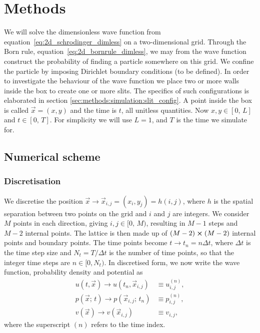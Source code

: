 
\section{Methods}\label{sec:methods}

We will solve the dimensionless wave function from equation~\eqref{eq:2d_schrodinger_dimless} on a two-dimensional grid. Through the Born rule, equation~\eqref{eq:2d_bornrule_dimless}, we may from the wave function construct the probability of finding a particle somewhere on this grid. We confine the particle by imposing Dirichlet boundary conditions (to be defined). In order to investigate the behaviour of the wave function we place two or more walls inside the box to create one or more slits. The specifics of such configurations is elaborated in section \ref{sec:methods:simulation:slit_config}. A point inside the box is called $\vec{x} =(x, y)$ and the time is $t$, all unitless quantities. Now $x, y \in [0,\,L]$ and $t\in[0,\,T]$. For simplicity we will use $L=1$, and $T$ is the time we simulate for. 

\subsection{Numerical scheme}\label{sec:methods:numerical_scheme}

    \subsubsection{Discretisation}\label{sec:methods:numerical_scheme:discretisation}
        We discretise the position $\vec{x} \to \vec{x}_{i,j} = (x_i, y_j) = h(i,j)$, where $h$ is the spatial separation between two points on the grid and $i$ and $j$ are integers. We consider $M$ points in each direction, giving $i, j \in [0,\, M)$, resulting in $M-1$ steps and $M-2$ internal points. The lattice is then made up of $(M-2) \cross (M-2)$ internal points and boundary points. The time points become $t\to t_n=n\Delta t$, where $\Delta t$ is the time step size and $N_t = T/\Delta t$ is the number of time points, so that the integer time steps are $n\in[0, N_t)$. In discretised form, we now write the wave function, probability density and potential as 
        \begin{align}
            u(t, \vec{x}) \to u(t_n, \vec{x}_{i,j}) &\equiv u_{i,j}^{(n)}, \\ 
            p(\vec{x};\, t) \to p(\vec{x}_{i,j};\, t_n) &\equiv p_{i,j}^{(n)}, \\
            v(\vec{x}) \to v(\vec{x}_{i,j})&\equiv v_{i,j}, 
        \end{align}
        where the superscript $(n)$ refers to the time index. 

